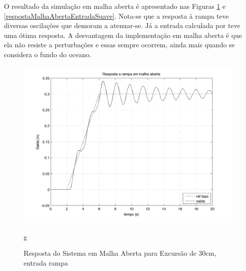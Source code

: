  O resultado da simulação em malha aberta é apresentado nas Figuras \ref{respostaMalhaAbertaRampa} e \ref{respostaMalhaAbertaEntradaSuave}. Nota-se que a resposta à rampa teve diversas oscilações que demoram a atenuar-se. Já a entrada calculada por \cite{rafaelMestrado} teve uma ótima resposta. A desvantagem da implementação em malha aberta é que ela não resiste a perturbações e essas sempre ocorrem, ainda mais quando se considera o fundo do oceano.
 
 \begin{figure}[!htb]
    \centering
    \begin{minipage}{.45\textwidth}
        \centering
        
        \includegraphics[width=1\linewidth]{figs/resultados/simulacao/respostaMalhaAbertaRampa}
        \label{respostaMalhaAbertaRampa}
        \caption{Resposta do Sistema em Malha Aberta para Excursão de 30cm, entrada rampa}g
    \end{minipage}%
    \hspace{0.1cm}
    \begin{minipage}{0.45\textwidth}
        \centering
        

\end{minipage}
\end{figure}
